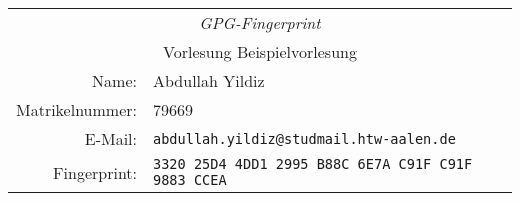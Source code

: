 \documentclass[12pt]{article}
\begin{document}
\begin{center}
  \renewcommand{\arraystretch}{1.2}
  \begin{tabular}{|rl|} \hline %
    \multicolumn{2}{|c|}{\emph{\large GPG-Fingerprint}} \\  %
    \multicolumn{2}{|c|}{Vorlesung Beispielvorlesung} \\ \hline %
    Name: & Abdullah Yildiz \\ %
    Matrikelnummer: & 79669 \\ %
    E-Mail: & \texttt{abdullah.yildiz@studmail.htw-aalen.de} \\ %
    Fingerprint: & \texttt{3320 25D4 4DD1 2995 B88C  6E7A C91F C91F 9883 CCEA} \\ \hline%
  \end{tabular}
\end{center}
\end{document}
